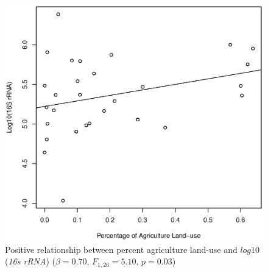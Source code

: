 \begin{figure}[p]
	\includegraphics[width=\textwidth]{figures/Agriculture}
	\caption{
Positive relationship between percent agriculture land-use and $log10$(\emph{16s rRNA}) ($\beta=0.70$, $F_{{1,26}}=5.10$, $p=0.03$)
}
	\label{fig:agriculture}
\end{figure}











